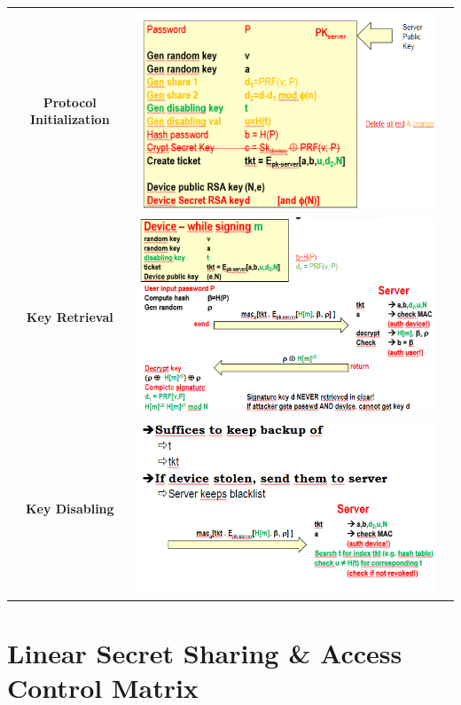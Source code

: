 \documentclass{book}
\begin{document}
\begin{tabular}{ccc}
    \textbf{Protocol Initialization}&\includegraphics[scale=0.4]{2022-01-06-17-31-58.png}%
&\\
\textbf{Key Retrieval}
&\includegraphics[scale=0.5]{2022-01-06-17-33-30.png}%
&
\\\textbf{Key Disabling}&
\includegraphics[scale=0.5]{2022-01-06-17-34-40.png}%
&
\end{tabular}
\chapter{Linear Secret Sharing \& Access Control Matrix}
\end{document}
